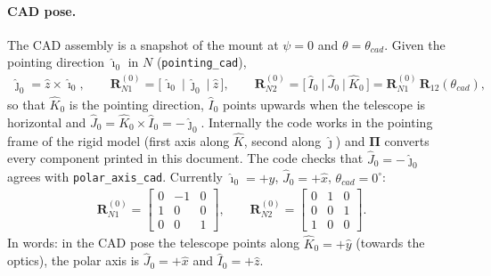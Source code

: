 \documentclass[10pt,a4paper]{article}
\numberwithin{equation}{section}
\begin{document}
\paragraph{CAD pose.} The CAD assembly is a snapshot of the mount at $\psi = 0$ and $\theta = \theta_{cad}$. Given the pointing direction $\hat\imath_0$ in $N$ (\texttt{pointing\_cad}),
\begin{gather}
\hat\jmath_0 = \hat z\times\hat\imath_0, \qquad \mathbf R_{N1}^{(0)} = \bigl[\,\hat\imath_0\ \big|\ \hat\jmath_0\ \big|\ \hat z\,\bigr], \qquad \mathbf R_{N2}^{(0)} = \bigl[\,\hat I_0\ \big|\ \hat J_0\ \big|\ \hat K_0\,\bigr] = \mathbf R_{N1}^{(0)}\,\mathbf R_{12}(\theta_{cad}),
\end{gather}
so that $\hat K_0$ is the pointing direction, $\hat I_0$ points upwards when the telescope is horizontal and $\hat J_0 = \hat K_0\times\hat I_0 = -\hat\jmath_0$. Internally the code works in the pointing frame of the rigid model (first axis along $\hat K$, second along $\hat\jmath$) and $\boldsymbol\Pi$ converts every component printed in this document.
The code checks that $\hat J_0 = -\hat\jmath_0$ agrees with \texttt{polar\_axis\_cad}. Currently $\hat\imath_0 = +\hat{y}$, $\hat J_0 = +\hat{x}$, $\theta_{cad} = 0^\circ$:
\begin{gather}
\mathbf R_{N1}^{(0)} = \begin{bmatrix}0 & -1 & 0 \\ 1 & 0 & 0 \\ 0 & 0 & 1\end{bmatrix}, \qquad \mathbf R_{N2}^{(0)} = \begin{bmatrix}0 & 1 & 0 \\ 0 & 0 & 1 \\ 1 & 0 & 0\end{bmatrix}.
\end{gather}
In words: in the CAD pose the telescope points along $\hat K_0 = +\hat{y}$ (towards the optics), the polar axis is $\hat J_0 = +\hat{x}$ and $\hat I_0 = +\hat{z}$.
\end{document}
